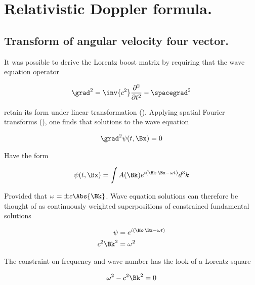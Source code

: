 %

\chapter{Relativistic Doppler formula.}
\label{chap:frequencyTx}
\date{June 27, 2009}

\beginArtWithToc

\section{Transform of angular velocity four vector.}

It was possible to derive the Lorentz boost matrix by requiring that the wave equation operator

\begin{align}
\grad^2 = \inv{c^2}\frac{\partial^2}{\partial t^2} - \spacegrad^2
\end{align}

retain its form under linear transformation (\citep{PJLorentzWave}).  Applying spatial Fourier transforms (\citep{PJwaveFourier}), one finds that solutions to the wave equation 

\begin{align}
\grad^2 \psi(t,\Bx) = 0
\end{align}

Have the form

\begin{align}
\psi(t, \Bx) = \int A(\Bk) e^{i(\Bk \cdot \Bx - \omega t)} d^3 k
\end{align}

Provided that $\omega = \pm c \Abs{\Bk}$.  Wave equation solutions can therefore be thought of as continuously weighted superpositions of constrained fundamental solutions

\begin{align}
\psi &= e^{i(\Bk \cdot \Bx - \omega t)} \\
c^2 \Bk^2 &= \omega^2
\end{align}

The constraint on frequency and wave number has the look of a Lorentz square

\begin{align}
\omega^2 - c^2 \Bk^2 = 0
\end{align}

